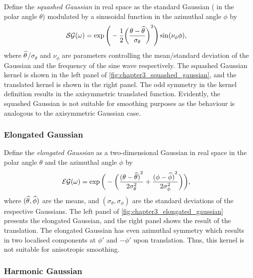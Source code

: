 Define the \emph{squashed Gaussian} in real space as the standard Gaussian (\ie{} in the polar angle \(\theta{}\)) modulated by a sinusoidal function in the azimuthal angle \(\phi{}\) by
%
\begin{equation}
	\mathcal{SG}(\omega)
	= \exp\Bigg(-\frac{1}{2}{\bigg(\frac{\theta-\widehat{\theta}}{\sigma_{\theta}}\bigg)}^{2}\Bigg)
	\sin(\nu_{\phi}\phi),
\end{equation}
%
where \(\widehat{\theta}\)/\(\sigma_{\theta}\) and \(\nu_{\phi}\) are parameters controlling the mean/standard deviation of the Gaussian and the frequency of the sine wave respectively.
The squashed Gaussian kernel is shown in the left panel of \cref{fig:chapter3_squashed_gaussian}, and the translated kernel is shown in the right panel.
The odd symmetry in the kernel definition results in the axisymmetric translated function.
Evidently, the squashed Gaussian is not suitable for smoothing purposes as the behaviour is analogous to the axisymmetric Gaussian case.



\subsubsection{Elongated Gaussian}

Define the \emph{elongated Gaussian} as a two-dimensional Gaussian in real space in the polar angle \(\theta{}\) and the azimuthal angle \(\phi{}\) by
%
\begin{equation}
	\mathcal{EG}(\omega)
	= \exp\bigg(-\bigg(\frac{{(\theta-\widehat{\theta})}^{2}}{2\sigma_{\theta}^{2}}
		+ \frac{{(\phi-\widehat{\phi})}^{2}}{2\sigma_{\phi}^{2}}\bigg)\bigg),
\end{equation}
%
where \((\widehat{\theta},\widehat{\phi})\) are the means, and \((\sigma_{\theta},\sigma_{\phi})\) are the standard deviations of the respective Gaussians.
The left panel of \cref{fig:chapter3_elongated_gaussian} presents the elongated Gaussian, and the right panel shows the result of the translation.
The elongated Gaussian has even azimuthal symmetry which results in two localised components at \(\phi'\) and \(-\phi'\) upon translation.
Thus, this kernel is not suitable for anisotropic smoothing.



\subsubsection{Harmonic Gaussian}

